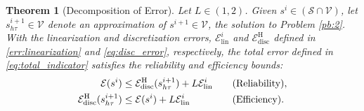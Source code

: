 \documentclass[review,11pt]{article}
\numberwithin{equation}{section}
\def \t  {\tau}
\def \calE {\mathcal{E}}
\def \calV {\mathcal{V}}
\def \calS {\mathcal{S}}
\newtheorem{theorem}[theorem]{Theorem}
\begin{document}
\begin{theorem}[Decomposition of Error]\label{theo:decomp}
Let $L\in (1,2)$. Given $s^i\in (\calS \cap \calV)$, let $s^{i+1}_{h\t}\in \calV$ denote an approximation of $s^{i+1}\in \calV$, the solution to Problem \ref{pb:2}. With the linearization and discretization errors, $\mathcal{E}^i_{\mathrm{lin}}$ and $\mathcal{E}^{\mathrm{H}}_{\mathrm{disc}}$ defined in \eqref{err:linearization} and \eqref{eq:disc_error}, respectively, the total error defined in \eqref{eq:total_indicator} satisfies the reliability and efficiency bounds:
\begin{subequations}
    \begin{align}
\mathcal{E}(s^i)
&\leq \calE_{\mathrm{disc}}^{\mathrm{H}}(s^{i+1}_{h\t}) + L\calE_{\mathrm{lin}}^i
\quad &&\textup{(Reliability)}, \label{reliability_bound}\\
\calE_{\mathrm{disc}}^{\mathrm{H}}(s^{i+1}_{h\t})
&\leq \mathcal{E}(s^i) + L\calE_{\mathrm{lin}}^i
\quad &&\textup{(Efficiency)}.\label{eq:efficiency}
\end{align}
\end{subequations}
\end{theorem}
\end{document}
